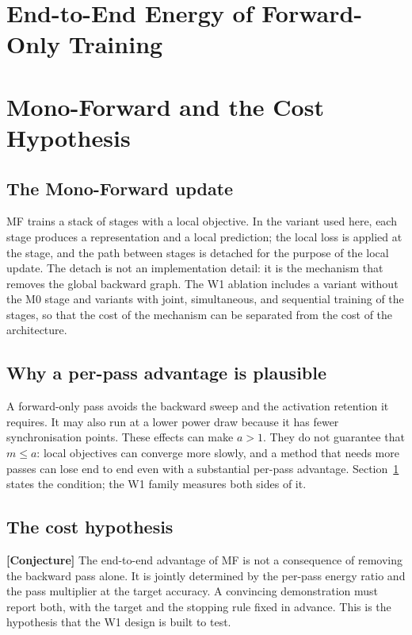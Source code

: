\documentclass[preprint,12pt]{elsarticle}
\begin{document}
\section{End-to-End Energy of Forward-Only Training}
\label{sec:theory}



\section{Mono-Forward and the Cost Hypothesis}
\label{sec:mf}

\subsection{The Mono-Forward update}
MF trains a stack of stages with a local objective.  In the variant used here,
each stage produces a representation and a local prediction; the local loss is
applied at the stage, and the path between stages is detached for the purpose
of the local update.  The detach is not an implementation detail: it is the
mechanism that removes the global backward graph.  The W1 ablation includes a
variant without the M0 stage and variants with joint, simultaneous, and
sequential training of the stages, so that the cost of the mechanism can be
separated from the cost of the architecture.

\subsection{Why a per-pass advantage is plausible}
A forward-only pass avoids the backward sweep and the activation retention it
requires.  It may also run at a lower power draw because it has fewer
synchronisation points.  These effects can make $a>1$.  They do not guarantee
that $m\le a$: local objectives can converge more slowly, and a method that
needs more passes can lose end to end even with a substantial per-pass
advantage.  Section~\ref{sec:theory} states the condition; the W1 family
measures both sides of it.

\subsection{The cost hypothesis}
\textbf{[Conjecture]} The end-to-end advantage of MF is not a consequence of
removing the backward pass alone.  It is jointly determined by the per-pass
energy ratio and the pass multiplier at the target accuracy.  A convincing
demonstration must report both, with the target and the stopping rule fixed in
advance.  This is the hypothesis that the W1 design is built to test.
\end{document}
